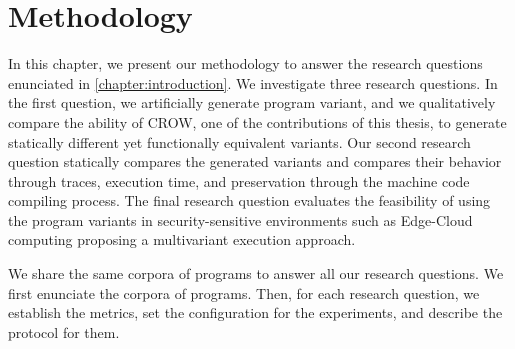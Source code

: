 
\chapter{Methodology} 
\label{chapter:method}

\pagestyle{plain}
\newcommand{\libsodiumfunctions}{869}
\newcommand{\qrcodefunctions}{1849}
\newcommand{\allmewefunctions}{\libsodiumfunctions + \qrcodefunctions}

\newcommand{\py}[1]{}
\newcommand{\fromjson}[2]{}

\newcommand{\corpusrosetta}{\fromjson{data/crow_corpus.json}{.[0].name}}
\newcommand{\corpussodium}{Libsodium\xspace}
\newcommand{\corpusqrcode}{QrCode\xspace}


\newcommand{\DTWStatic}{dt\_static\xspace}
\newcommand{\DTW}{dt\_dyn\xspace}
\newcommand{\tool}{CROW\xspace}


In this chapter, we present our methodology to answer the research questions enunciated in \autoref{chapter:introduction}.
We investigate three research questions. 
In the first question, we artificially generate \wasm program variant, and we qualitatively compare the ability of CROW, one of the contributions of this thesis, to generate statically different yet functionally equivalent variants. 
Our second research question statically compares the generated variants and compares their behavior through traces, execution time, and preservation through the machine code compiling process.
The final research question evaluates the feasibility of using the program variants in security-sensitive environments such as Edge-Cloud computing proposing a multivariant execution approach.


We share the same corpora of programs to answer all our research questions. We first enunciate the corpora of programs. Then, for each research question, we establish the metrics, set the configuration for the experiments, and describe the protocol for them.

